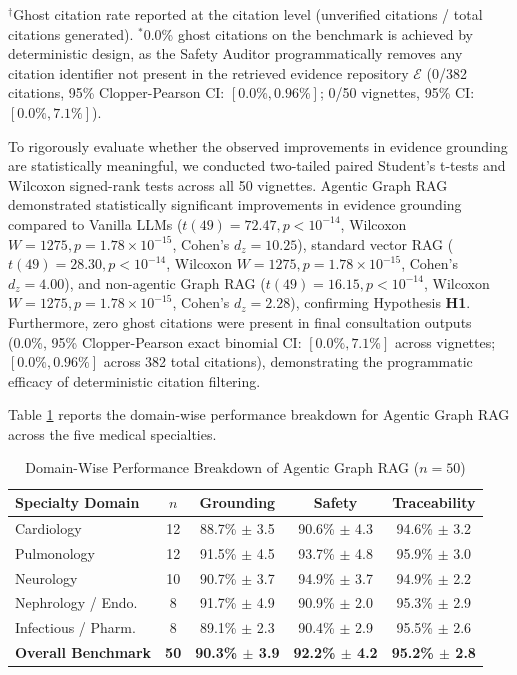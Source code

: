\documentclass[journal,10pt,twocolumn]{IEEEtran}
\begin{document}
\begin{table}[!t]
\begin{tabularx}{\textwidth}
\bottomrule
\end{tabularx}
\vspace{1pt}
{\scriptsize $^\dagger$Ghost citation rate reported at the citation level (unverified citations / total citations generated). $^\ast$0.0\% ghost citations on the benchmark is achieved by deterministic design, as the Safety Auditor programmatically removes any citation identifier not present in the retrieved evidence repository $\mathcal{E}$ (0/382 citations, 95\% Clopper-Pearson CI: $[0.0\%, 0.96\%]$; 0/50 vignettes, 95\% CI: $[0.0\%, 7.1\%]$).}
\end{table}

To rigorously evaluate whether the observed improvements in evidence grounding are statistically meaningful, we conducted two-tailed paired Student's t-tests and Wilcoxon signed-rank tests across all 50 vignettes. Agentic Graph RAG demonstrated statistically significant improvements in evidence grounding compared to Vanilla LLMs ($t(49) = 72.47, p < 10^{-14}$, Wilcoxon $W = 1275, p = 1.78 \times 10^{-15}$, Cohen's $d_z = 10.25$), standard vector RAG ($t(49) = 28.30, p < 10^{-14}$, Wilcoxon $W = 1275, p = 1.78 \times 10^{-15}$, Cohen's $d_z = 4.00$), and non-agentic Graph RAG ($t(49) = 16.15, p < 10^{-14}$, Wilcoxon $W = 1275, p = 1.78 \times 10^{-15}$, Cohen's $d_z = 2.28$), confirming Hypothesis \textbf{H1}. Furthermore, zero ghost citations were present in final consultation outputs (0.0\%, 95\% Clopper-Pearson exact binomial CI: $[0.0\%, 7.1\%]$ across vignettes; $[0.0\%, 0.96\%]$ across 382 total citations), demonstrating the programmatic efficacy of deterministic citation filtering.

Table \ref{tab:domain_results} reports the domain-wise performance breakdown for Agentic Graph RAG across the five medical specialties.

\begin{table}[!t]
\centering
\caption{Domain-Wise Performance Breakdown of Agentic Graph RAG ($n=50$)}
\label{tab:domain_results}
\footnotesize
\setlength{\tabcolsep}{2.5pt}
\begin{tabularx}{\columnwidth}{>{\raggedright\arraybackslash}X c c c c}
\toprule
\textbf{Specialty Domain} & \textbf{$n$} & \textbf{Grounding} & \textbf{Safety} & \textbf{Traceability} \\
\midrule
Cardiology & 12 & 88.7\% $\pm$ 3.5 & 90.6\% $\pm$ 4.3 & 94.6\% $\pm$ 3.2 \\
Pulmonology & 12 & 91.5\% $\pm$ 4.5 & 93.7\% $\pm$ 4.8 & 95.9\% $\pm$ 3.0 \\
Neurology & 10 & 90.7\% $\pm$ 3.7 & 94.9\% $\pm$ 3.7 & 94.9\% $\pm$ 2.2 \\
Nephrology / Endo. & 8 & 91.7\% $\pm$ 4.9 & 90.9\% $\pm$ 2.0 & 95.3\% $\pm$ 2.9 \\
Infectious / Pharm. & 8 & 89.1\% $\pm$ 2.3 & 90.4\% $\pm$ 2.9 & 95.5\% $\pm$ 2.6 \\
\midrule
\textbf{Overall Benchmark} & \textbf{50} & \textbf{90.3\% $\pm$ 3.9} & \textbf{92.2\% $\pm$ 4.2} & \textbf{95.2\% $\pm$ 2.8} \\
\bottomrule
\end{tabularx}
\end{table}
\end{document}
